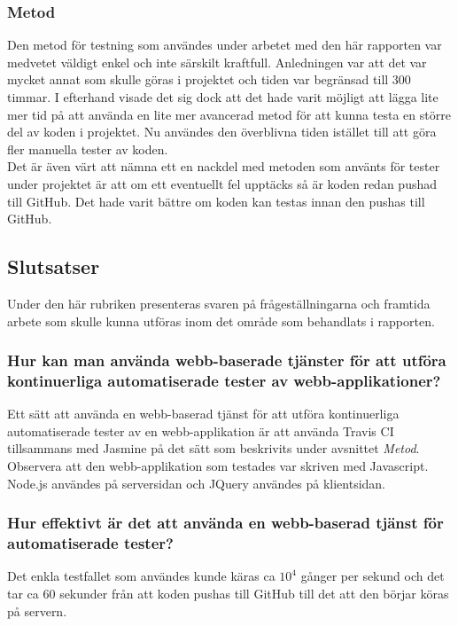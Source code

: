 \subsubsection{Metod}
Den metod för testning som användes under arbetet med den här rapporten var
medvetet väldigt enkel och inte särskilt kraftfull. Anledningen var
att det var mycket annat som skulle göras i projektet och tiden var
begränsad till 300 timmar. I efterhand visade det sig dock att det hade varit 
möjligt att lägga lite mer tid på att använda en lite
mer avancerad metod för att kunna testa en större
del av koden i projektet. Nu användes den överblivna tiden istället till
att göra fler manuella tester av koden.\\

Det är även värt att nämna ett en nackdel med metoden som använts för tester
under projektet
är att om ett eventuellt fel upptäcks så är koden redan pushad till GitHub.
Det hade varit bättre om koden kan testas innan den pushas till GitHub.

\subsection{Slutsatser}
Under den här rubriken presenteras svaren på
frågeställningarna och framtida arbete som skulle
kunna utföras inom det område som behandlats i rapporten.

\subsubsection{Hur kan man använda webb-baserade tjänster för
att utföra kontinuerliga automatiserade tester av webb-applikationer?}
Ett sätt att använda en webb-baserad tjänst för att utföra kontinuerliga 
automatiserade tester av en webb-applikation är att använda  
Travis CI tillsammans med Jasmine på det sätt som beskrivits
under avsnittet \emph{Metod}. Observera att den webb-applikation som testades
var skriven med Javascript. Node.js användes på serversidan och 
JQuery användes på klientsidan.

\subsubsection{Hur effektivt är det att använda en webb-baserad tjänst
för automatiserade tester?}
Det enkla testfallet som användes kunde käras ca $10^4$ gånger per sekund och
det tar ca 60 sekunder från att koden pushas till GitHub till det att den
börjar köras på servern.\\

